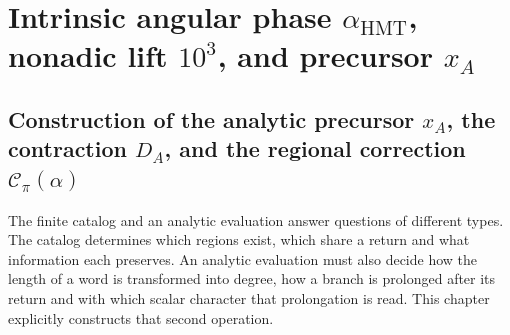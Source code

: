 
\label{chap:p3-83-30-angulo_contraangulo}

\label{p3-20260826:chap:realizacion-analitica-contraangulo}

\section{Intrinsic angular phase \texorpdfstring{\(\alpha_{\mathrm{HMT}}\)}{alpha HMT}, nonadic lift \texorpdfstring{\(10^3\)}{10^3}, and precursor \texorpdfstring{\(x_A\)}{x_A}}
\label{sec:s102:c38:1}

\subsection{Construction of the analytic precursor \texorpdfstring{\(x_A\)}{x_A}, the contraction \texorpdfstring{\(D_A\)}{D_A}, and the regional correction \texorpdfstring{\(\mathscr C_\pi(\alpha)\)}{C_pi(alpha)}}
\label{sec:s102:c38:1:1}

\label{p3-83-c30-s1:chap:realizacion-analitica-contraangulo}

The finite catalog and an analytic evaluation answer questions of different
types. The catalog determines which regions exist, which share a
return and what information each preserves. An analytic evaluation must
also decide how the length of a word is transformed into degree, how
a branch is prolonged after its return and with which scalar character that
prolongation is read. This chapter explicitly constructs that second
operation.

